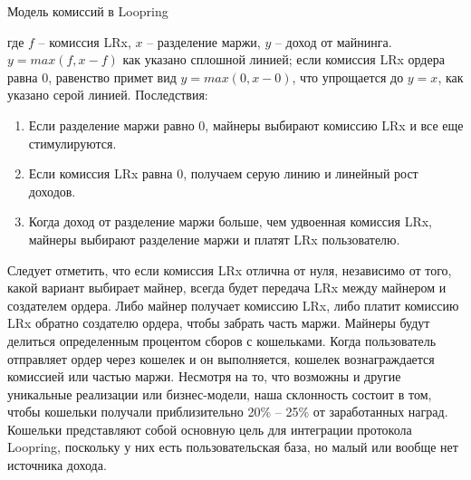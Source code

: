 \documentclass[utf8,nofonts]{article}
\makeatletter
\newenvironment{figurehere}
 {\def\@captype{figure}}
 {}
\makeatother
\begin{document}
\begin{multicols}{2}
\begin{center}
\begin{figurehere}
			\caption{Модель комиссий в Loopring}
			\label{fig:feemodel}
			\end{figurehere}
			\end{center}
			где $f$ -- комиссия LRx, $x$ -- разделение маржи, $y$ -- доход от майнинга. $y=max(f, x-f)$ как указано сплошной линией; если комиссия LRx ордера равна $ 0 $, равенство примет вид $ y = max (0, x - 0) $, что упрощается до $ y = x $, как указано серой линией.
			Последствия:  
			\begin{enumerate}
			\item Если разделение маржи равно 0, майнеры выбирают комиссию LRx и все еще стимулируются. 
			\item Если комиссия LRx равна 0, получаем серую линию и линейный рост доходов.
			\item Когда доход от разделение маржи больше, чем удвоенная комиссия LRx, майнеры выбирают разделение маржи и платят LRx пользователю.
			\end{enumerate}
			Следует отметить, что если комиссия LRx отлична от нуля, независимо от того, какой вариант выбирает майнер, всегда будет передача LRx между майнером и создателем ордера. Либо майнер получает комиссию LRx, либо платит комиссию LRx обратно создателю ордера, чтобы забрать часть маржи.
			Майнеры будут делиться определенным процентом сборов с кошельками. Когда пользователь отправляет ордер через кошелек и он выполняется, кошелек вознаграждается комиссией или частью маржи. Несмотря на то, что возможны и другие уникальные реализации или бизнес-модели, наша склонность состоит в том, чтобы кошельки получали приблизительно 20\% -- 25\% от заработанных наград. Кошельки представляют собой основную цель для интеграции протокола Loopring, поскольку у них есть пользовательская база, но малый или вообще нет источника дохода.

\end{multicols}
\end{document}

